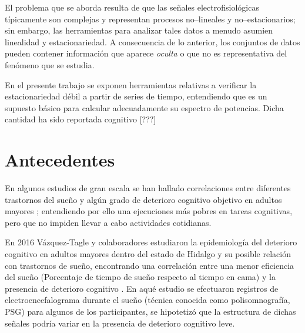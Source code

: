El problema que se aborda resulta de que las señales electrofisiológicas típicamente son complejas 
y representan procesos no--lineales y no--estacionarios; sin embargo, las herramientas para 
analizar tales datos a menudo asumien linealidad y estacionariedad.
%
A consecuencia de lo anterior, los conjuntos de datos pueden contener información que aparece
\textit{oculta} o que no es representativa del fenómeno que se estudia. 

En el presente trabajo se exponen herramientas relativas a verificar la estacionariedad débil a 
partir de series de tiempo, entendiendo que es un supuesto básico para calcular adecuadamente su 
espectro de potencias.
%
Dicha cantidad ha sido reportada 
cognitivo [???]%


\section{Antecedentes}

En algunos estudios de gran escala se han hallado correlaciones entre diferentes trastornos del 
sueño y algún grado de deterioro cognitivo objetivo en adultos mayores 
\cite{Amer13,Miyata13,Reid06,Potvin12}; entendiendo por ello una ejecuciones más pobres en tareas
cognitivas, pero que no impiden llevar a cabo actividades cotidianas.

En 2016 Vázquez-Tagle y colaboradores estudiaron la epidemiología del deterioro cognitivo en 
adultos mayores dentro del estado de Hidalgo y su posible relación con trastornos de sueño, 
encontrando una correlación entre una menor eficiencia del sueño (Porcentaje de tiempo
de sueño respecto al tiempo en cama) y la presencia de deterioro cognitivo \cite{VazquezTagle16}.
%
En aqué estudio se efectuaron registros de electroencefalograma durante el sueño (técnica conocida
como polisomnografía, PSG) para algunos de los participantes, se hipotetizó que la estructura
de dichas señales podría variar en la presencia de deterioro cognitivo leve.



